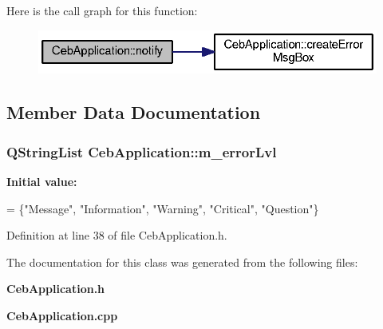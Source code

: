Here is the call graph for this function\-:\nopagebreak
\begin{figure}[H]
\begin{center}
\leavevmode
\includegraphics[width=324pt]{class_ceb_application_ab7e35c7770b6ee5c120429ab96ac6963_cgraph}
\end{center}
\end{figure}




\subsection{Member Data Documentation}
\subsubsection[{m\-\_\-error\-Lvl}]{\setlength{\rightskip}{0pt plus 5cm}Q\-String\-List Ceb\-Application\-::m\-\_\-error\-Lvl}\label{class_ceb_application_a5e62286266b9bff3fd192095faedd1a7}
{\bfseries Initial value\-:}
\begin{DoxyCode}
= \{\textcolor{stringliteral}{"Message"}, \textcolor{stringliteral}{"Information"}, \textcolor{stringliteral}{"Warning"},
                              \textcolor{stringliteral}{"Critical"}, \textcolor{stringliteral}{"Question"}\}
\end{DoxyCode}


Definition at line 38 of file Ceb\-Application.\-h.



The documentation for this class was generated from the following files\-:\begin{DoxyCompactItemize}
\item 
{\bf Ceb\-Application.\-h}\item 
{\bf Ceb\-Application.\-cpp}\end{DoxyCompactItemize}
